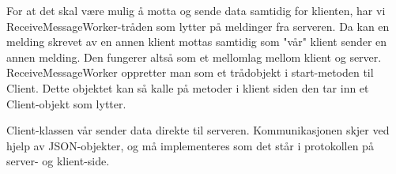 \documentclass[a4paper,12pt, norsk]{article}
\begin{document}
For at det skal være mulig å motta og sende data samtidig for klienten, har vi ReceiveMessageWorker-tråden som lytter på meldinger fra serveren. Da kan en melding skrevet av en annen klient mottas samtidig som "vår" klient sender en annen melding. Den fungerer altså som et mellomlag mellom klient og server. ReceiveMessageWorker oppretter man som et trådobjekt i start-metoden til Client. Dette objektet kan så kalle på metoder i klient siden den tar inn et Client-objekt som lytter. 

Client-klassen vår sender data direkte til serveren. Kommunikasjonen skjer ved hjelp av JSON-objekter, og må implementeres som det står i protokollen på server- og klient-side.
\end{document}
